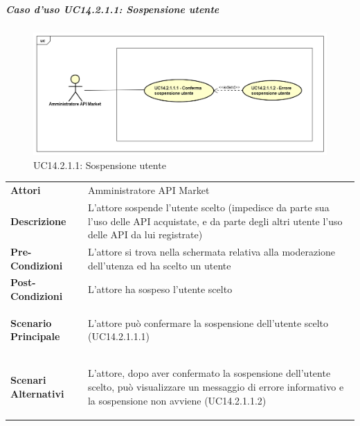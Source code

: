 \newpage
\subparagraph{Caso d'uso UC14.2.1.1: Sospensione utente}
\label{UC14_2_1_1}
\begin{figure}[ht]
	\centering
	\includegraphics[scale=0.45]{UML/UC14_2_1_1.png}
	\caption{UC14.2.1.1: Sospensione utente}
\end{figure}

\begin{minipage}{\linewidth}
	\begin{tabular}{ l | p{11cm}}
		\hline
		\rowcolor{Gray}
		\multicolumn{2}{c}{UC14.2.1.1 - Sospensione utente} \\
		\hline
		\textbf{Attori} & Amministratore API Market \\
		\textbf{Descrizione} & L'attore sospende l'utente scelto (impedisce da parte sua l'uso delle API acquistate, e da parte degli altri utente l'uso delle API da lui registrate) \\
		\textbf{Pre-Condizioni} & L'attore si trova nella schermata relativa alla moderazione dell'utenza ed ha scelto un utente \\
		\textbf{Post-Condizioni} & L'attore ha sospeso l'utente scelto \\
		\textbf{Scenario Principale} & 
		\begin{enumerate*}[label=(\arabic*.),itemjoin={\newline}]
			\item L'attore può confermare la sospensione dell'utente scelto (UC14.2.1.1.1)
		\end{enumerate*}\\
		\textbf{Scenari Alternativi} & 
		\begin{enumerate*}[label=(\arabic*.),itemjoin={\newline}]
			\item L'attore, dopo aver confermato la sospensione dell'utente scelto, può visualizzare un messaggio di errore informativo e la sospensione non avviene (UC14.2.1.1.2)
		\end{enumerate*}\\
	\end{tabular}
\end{minipage}

